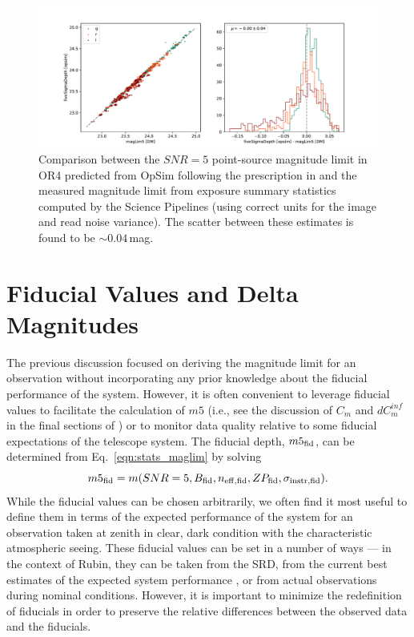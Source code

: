 \documentclass[DM,authoryear,toc]{lsstdoc}
\begin{document}
\begin{figure}
    \includegraphics[width=\textwidth]{figures/or4_opsim_m5.pdf}
    \caption{\label{fig:opsim} Comparison between the $SNR=5$ point-source magnitude limit in OR4 predicted from OpSim following the prescription in \citet{SMTN-002} and the measured magnitude limit from exposure summary statistics computed by the Science Pipelines (using correct units for the image and read noise variance). The scatter between these estimates is found to be $\sim 0.04$\,mag.}
\end{figure}

\section{Fiducial Values and Delta Magnitudes}
\label{sec:fid}

The previous discussion focused on deriving the magnitude limit for an observation without incorporating any prior knowledge about the fiducial performance of the system. However, it is often convenient to leverage fiducial values to facilitate the calculation of $m5$ (i.e., see the discussion of $C_m$ and $dC_m^{inf}$ in the final sections of \citealt{SMTN-002}) or to monitor data quality relative to some fiducial expectations of the telescope system. The fiducial depth, $m5_{\rm fid}$, can be determined from Eq.~\ref{eqn:stats_maglim} by solving 
\begin{equation}
    m5_{\rm fid} = m(SNR=5, B_{\rm fid}, n_{\rm eff,fid}, ZP_{\rm fid}, \sigma_{\rm instr,fid}).
\end{equation}
While the fiducial values can be chosen arbitrarily, we often find it most useful to define them in terms of the expected performance of the system for an observation taken at zenith in  clear, dark condition with the characteristic atmospheric seeing. These fiducial values can be set in a number of ways --- in the context of Rubin, they can be taken from the SRD, from the current best estimates of the expected system performance \citep{SMTN-002}, or from actual observations during nominal conditions. However, it is important to minimize the redefinition of fiducials in order to preserve the relative differences between the observed data and the fiducials.
\end{document}
